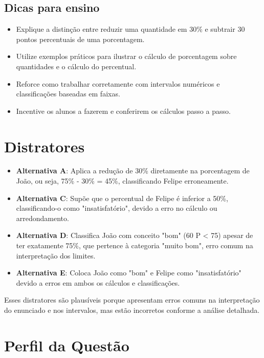 \documentclass{article}
\begin{document}
\subsection{Dicas para ensino}
\begin{itemize}
  \item Explique a distinção entre reduzir uma quantidade em 30\% e subtrair 30 pontos percentuais de uma porcentagem.
  \item Utilize exemplos práticos para ilustrar o cálculo de porcentagem sobre quantidades e o cálculo do percentual.
  \item Reforce como trabalhar corretamente com intervalos numéricos e classificações baseadas em faixas.
  \item Incentive os alunos a fazerem e conferirem os cálculos passo a passo.
\end{itemize}

\section{Distratores}
\begin{itemize}
  \item \textbf{Alternativa A}: Aplica a redução de 30\% diretamente na porcentagem de João, ou seja, 75\% - 30\% = 45\%, classificando Felipe erroneamente.
  \item \textbf{Alternativa C}: Supõe que o percentual de Felipe é inferior a 50\%, classificando-o como "insatisfatório", devido a erro no cálculo ou arredondamento.
  \item \textbf{Alternativa D}: Classifica João com conceito "bom" (60 \leq P < 75) apesar de ter exatamente 75\%, que pertence à categoria "muito bom", erro comum na interpretação dos limites.
  \item \textbf{Alternativa E}: Coloca João como "bom" e Felipe como "insatisfatório" devido a erros em ambos os cálculos e classificações.
\end{itemize}

Esses distratores são plausíveis porque apresentam erros comuns na interpretação do enunciado e nos intervalos, mas estão incorretos conforme a análise detalhada.

\section{Perfil da Questão}
\end{document}
